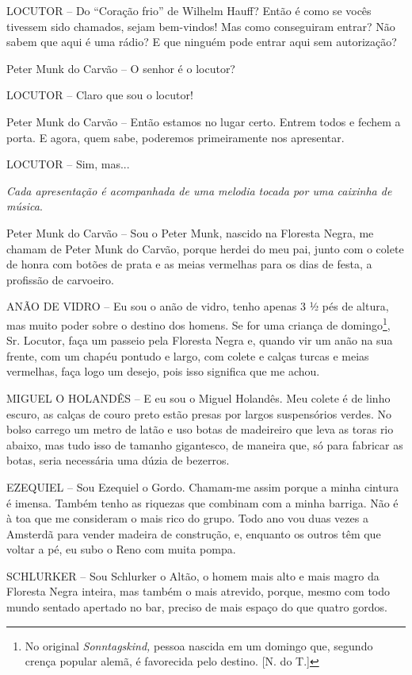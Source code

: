 LOCUTOR -- Do ``Coração frio'' de Wilhelm Hauff? Então é como se vocês
tivessem sido chamados, sejam bem-vindos! Mas como conseguiram entrar?
Não sabem que aqui é uma rádio? E que ninguém pode entrar aqui sem
autorização?

Peter Munk do Carvão -- O senhor é o locutor?

LOCUTOR -- Claro que sou o locutor!

Peter Munk do Carvão -- Então estamos no lugar certo. Entrem todos e
fechem a porta. E agora, quem sabe, poderemos primeiramente nos
apresentar.

LOCUTOR -- Sim, mas...

\emph{Cada apresentação é acompanhada de uma melodia tocada por uma
caixinha de música}.

Peter Munk do Carvão -- Sou o Peter Munk, nascido na Floresta Negra, me
chamam de Peter Munk do Carvão, porque herdei do meu pai, junto com o
colete de honra com botões de prata e as meias vermelhas para os dias de
festa, a profissão de carvoeiro.

ANÃO DE VIDRO -- Eu sou o anão de vidro, tenho apenas 3 ½ pés de altura,
mas muito poder sobre o destino dos homens. Se for uma criança de
domingo\footnote{No original \emph{Sonntagskind,} pessoa nascida em um
  domingo que, segundo crença popular alemã, é favorecida pelo destino.
  {[}N. do T.{]}}, Sr. Locutor, faça um passeio pela Floresta Negra e,
quando vir um anão na sua frente, com um chapéu pontudo e largo, com
colete e calças turcas e meias vermelhas, faça logo um desejo, pois isso
significa que me achou.

MIGUEL O HOLANDÊS -- E eu sou o Miguel Holandês. Meu colete é de linho
escuro, as calças de couro preto estão presas por largos suspensórios
verdes. No bolso carrego um metro de latão e uso botas de madeireiro que
leva as toras rio abaixo, mas tudo isso de tamanho gigantesco, de
maneira que, só para fabricar as botas, seria necessária uma dúzia de
bezerros.

EZEQUIEL -- Sou Ezequiel o Gordo. Chamam-me assim porque a minha cintura
é imensa. Também tenho as riquezas que combinam com a minha barriga. Não
é à toa que me consideram o mais rico do grupo. Todo ano vou duas vezes
a Amsterdã para vender madeira de construção, e, enquanto os outros têm
que voltar a pé, eu subo o Reno com muita pompa.

SCHLURKER -- Sou Schlurker o Altão, o homem mais alto e mais magro da
Floresta Negra inteira, mas também o mais atrevido, porque, mesmo com
todo mundo sentado apertado no bar, preciso de mais espaço do que quatro
gordos.

